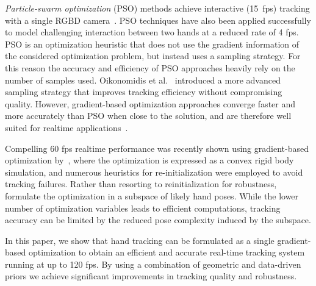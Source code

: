 \emph{Particle-swarm optimization} (PSO) methods achieve interactive (15~fps) tracking with a single RGBD camera~\cite{oiko_bmvc11}. PSO techniques have also been applied successfully to model challenging interaction between two hands \cite{oiko_cvpr12} at a reduced rate of 4 fps. 
PSO is an optimization heuristic that does not use the gradient information of the considered optimization problem, but instead uses a sampling strategy.
For this reason the accuracy and efficiency of PSO approaches heavily rely on the number of samples used. Oikonomidis et al.~\cite{oiko_cvpr14} introduced a more advanced sampling strategy that improves tracking efficiency without compromising quality. However, gradient-based optimization approaches  converge faster and more accurately than PSO when close to the solution, and are therefore well suited for realtime applications~\cite{qian_cvpr14}.


Compelling 60 fps realtime performance was recently shown using gradient-based optimization by~\cite{melax_13}, where the optimization is expressed as a convex rigid body simulation, and numerous heuristics for re-initialization were employed to avoid tracking failures. Rather than resorting to reinitialization for robustness, \cite{schroeder_icra14} formulate the optimization in a subspace of likely hand poses. While the lower number of optimization variables leads to efficient computations, tracking accuracy can be limited by the reduced pose complexity induced by the subspace.

 In this paper, we show that hand tracking can be formulated as a single gradient-based optimization to obtain an efficient and accurate real-time tracking system running at up to 120 fps. By using a combination of geometric and data-driven priors we achieve significant improvements in tracking quality and robustness.








